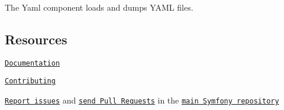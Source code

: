 The Yaml component loads and dumps Y\+A\+ML files.

\subsection*{Resources }


\begin{DoxyItemize}
\item \href{https://symfony.com/doc/current/components/yaml/index.html}{\tt Documentation}
\item \href{https://symfony.com/doc/current/contributing/index.html}{\tt Contributing}
\item \href{https://github.com/symfony/symfony/issues}{\tt Report issues} and \href{https://github.com/symfony/symfony/pulls}{\tt send Pull Requests} in the \href{https://github.com/symfony/symfony}{\tt main Symfony repository} 
\end{DoxyItemize}